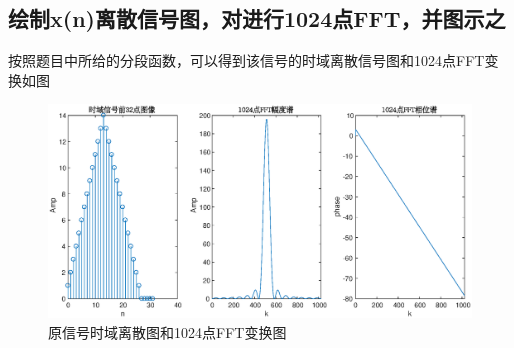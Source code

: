 \documentclass[UTF8]{article}
\begin{document}
\begin{CJK}{UTF8}{gkai}
\subsection{绘制x(n)离散信号图，对进行1024点FFT，并图示之}
按照题目中所给的分段函数，可以得到该信号的时域离散信号图和1024点FFT变换如图
\begin{figure}
  \centering
  \includegraphics[scale=0.5]{pro3_subpro1.eps}
  \caption{原信号时域离散图和1024点FFT变换图}
  \label{pro3_fig1}
\end{figure}

\end{CJK}
\end{document}
